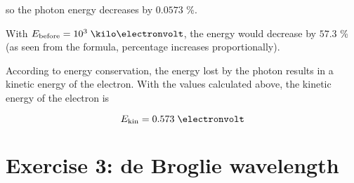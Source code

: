 \documentclass[a4paper,german,12pt,smallheadings]{scrartcl}
\begin{document}
\begin{enumerate}[a)]
    so the photon energy decreases by $0.0573$ \%.

    With $E_{\text{before}} = 10^3 \; \kilo\electronvolt$, the energy would
    decrease by $57.3$ \% (as seen from the formula, percentage increases
    proportionally).

    According to energy conservation, the energy lost by the photon results in
    a kinetic energy of the electron. With the values calculated above, the
    kinetic energy of the electron is

    \begin{equation*}
      E_\text{kin} = 0.573 \; \electronvolt
    \end{equation*}
\end{enumerate}

\section*{Exercise 3: de Broglie wavelength}
\end{document}
